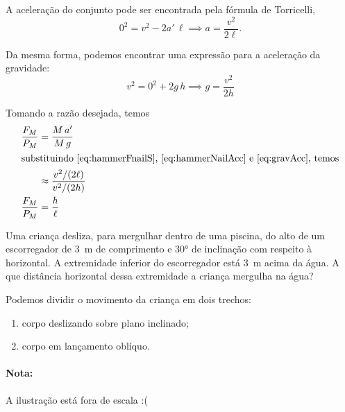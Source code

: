 \documentclass[]{IMTexam}
\begin{document}
\begin{questions}
\begin{solution}
		A aceleração do conjunto pode ser encontrada pela fórmula de Torricelli,
		\begin{equation}\label{eq:hammerNailAcc}
			0^{2}=v^{2}-2a'\,\ell\implies a=\dfrac{v^{2}}{2\ell}.
		\end{equation}

		Da mesma forma, podemos encontrar uma expressão para a aceleração da gravidade:
		\begin{equation}\label{eq:gravAcc}
			v^{2}=0^{2}+2g\,h\implies g=\dfrac{v^{2}}{2h}
		\end{equation}

		Tomando a razão desejada, temos
		\begin{align*}
			\dfrac{F_M}{P_M} & =\dfrac{M\,a'}{M\,g}                     \\
			\intertext{substituindo \ref{eq:hammerFnailS}, \ref{eq:hammerNailAcc} e \ref{eq:gravAcc}, temos}
			                 & \approx\dfrac{v^{2}/(2\ell)}{v^{2}/(2h)} \\
			\dfrac{F_M}{P_M} & =\dfrac{h}{\ell}
		\end{align*}

		\hfill\qedsymbol
	\end{solution}



	\question
	Uma criança desliza, para mergulhar dentro de uma piscina, do alto de um escorregador de \SI{3}{\meter} de comprimento e \ang{30} de inclinação com respeito à horizontal. A extremidade inferior do escorregador está \SI{3}{\meter} acima da água. A que distância horizontal dessa extremidade a criança mergulha na água?

	\clearpage

	\begin{solution}

		\begin{multi}
			Podemos dividir o movimento da criança em dois trechos:
			\begin{enumerate}[label=(\roman*)]
				\item corpo deslizando sobre plano inclinado;
				\item corpo em lançamento oblíquo.
			\end{enumerate}

			\paragraph{Nota:}
			A ilustração está fora de escala :(


\end{multi}
\end{solution}
\end{questions}
\end{document}

